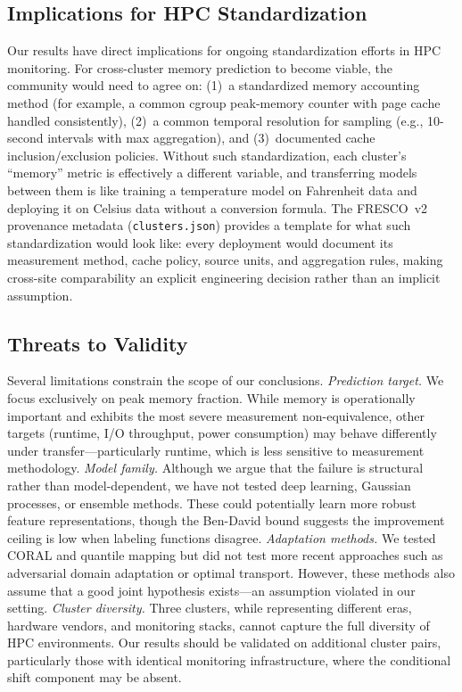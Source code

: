 \documentclass[sigconf]{acmart}
\begin{document}
\subsection{Implications for HPC Standardization}

Our results have direct implications for ongoing standardization efforts in HPC monitoring.
For cross-cluster memory prediction to become viable, the community would need to agree on: (1)~a standardized memory accounting method (for example, a common cgroup peak-memory counter with page cache handled consistently), (2)~a common temporal resolution for sampling (e.g., 10-second intervals with max aggregation), and (3)~documented cache inclusion/exclusion policies.
Without such standardization, each cluster's ``memory'' metric is effectively a different variable, and transferring models between them is like training a temperature model on Fahrenheit data and deploying it on Celsius data without a conversion formula.
The FRESCO~v2 provenance metadata (\texttt{clusters.json}) provides a template for what such standardization would look like: every deployment would document its measurement method, cache policy, source units, and aggregation rules, making cross-site comparability an explicit engineering decision rather than an implicit assumption.

\subsection{Threats to Validity}

Several limitations constrain the scope of our conclusions.
\emph{Prediction target.}
We focus exclusively on peak memory fraction.
While memory is operationally important and exhibits the most severe measurement non-equivalence, other targets (runtime, I/O throughput, power consumption) may behave differently under transfer---particularly runtime, which is less sensitive to measurement methodology.
\emph{Model family.}
Although we argue that the failure is structural rather than model-dependent, we have not tested deep learning, Gaussian processes, or ensemble methods.
These could potentially learn more robust feature representations, though the Ben-David bound suggests the improvement ceiling is low when labeling functions disagree.
\emph{Adaptation methods.}
We tested CORAL and quantile mapping but did not test more recent approaches such as adversarial domain adaptation or optimal transport.
However, these methods also assume that a good joint hypothesis exists---an assumption violated in our setting.
\emph{Cluster diversity.}
Three clusters, while representing different eras, hardware vendors, and monitoring stacks, cannot capture the full diversity of HPC environments.
Our results should be validated on additional cluster pairs, particularly those with identical monitoring infrastructure, where the conditional shift component may be absent.
\end{document}

